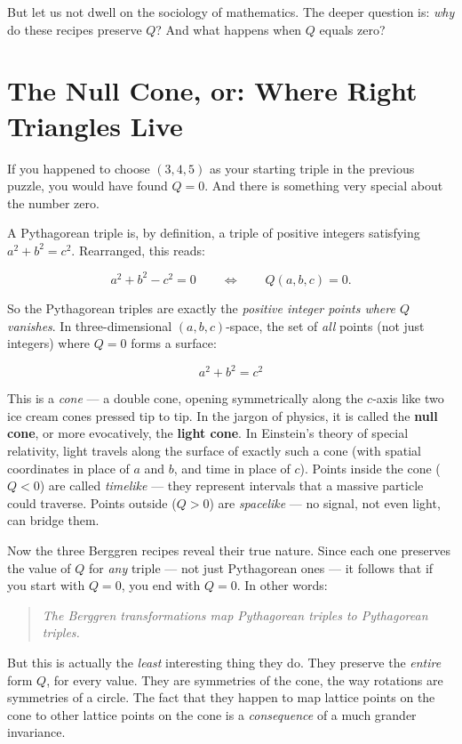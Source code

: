 \documentclass[11pt,twoside,openright]{book}
\theoremstyle{definition}
\theoremstyle{remark}
\begin{document}
But let us not dwell on the sociology of mathematics. The deeper question is: \textit{why} do these recipes preserve $Q$? And what happens when $Q$ equals zero?


\section{The Null Cone, or: Where Right Triangles Live}

If you happened to choose $(3, 4, 5)$ as your starting triple in the previous puzzle, you would have found $Q = 0$. And there is something very special about the number zero.

A Pythagorean triple is, by definition, a triple of positive integers satisfying $a^2 + b^2 = c^2$. Rearranged, this reads:

\[a^2 + b^2 - c^2 = 0 \qquad\Longleftrightarrow\qquad Q(a, b, c) = 0.\]

So the Pythagorean triples are exactly the \textit{positive integer points where $Q$ vanishes}. In three-dimensional $(a, b, c)$-space, the set of \textit{all} points (not just integers) where $Q = 0$ forms a surface:

\[a^2 + b^2 = c^2\]

This is a \textit{cone} --- a double cone, opening symmetrically along the $c$-axis like two ice cream cones pressed tip to tip. In the jargon of physics, it is called the \textbf{null cone}, or more evocatively, the \textbf{light cone}. In Einstein's theory of special relativity, light travels along the surface of exactly such a cone (with spatial coordinates in place of $a$ and $b$, and time in place of $c$). Points inside the cone ($Q < 0$) are called \textit{timelike} --- they represent intervals that a massive particle could traverse. Points outside ($Q > 0$) are \textit{spacelike} --- no signal, not even light, can bridge them.


Now the three Berggren recipes reveal their true nature. Since each one preserves the value of $Q$ for \textit{any} triple --- not just Pythagorean ones --- it follows that if you start with $Q = 0$, you end with $Q = 0$. In other words:

\begin{quote}
\textit{The Berggren transformations map Pythagorean triples to Pythagorean triples.}
\end{quote}
But this is actually the \textit{least} interesting thing they do. They preserve the \textit{entire} form $Q$, for every value. They are symmetries of the cone, the way rotations are symmetries of a circle. The fact that they happen to map lattice points on the cone to other lattice points on the cone is a \textit{consequence} of a much grander invariance.
\end{document}
